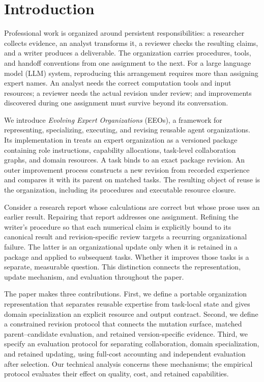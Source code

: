 \section{Introduction}
Professional work is organized around persistent responsibilities: a researcher collects evidence, an analyst transforms it, a reviewer checks the resulting claims, and a writer produces a deliverable. The organization carries procedures, tools, and handoff conventions from one assignment to the next. For a large language model (LLM) system, reproducing this arrangement requires more than assigning expert names. An analyst needs the correct computation tools and input resources; a reviewer needs the actual revision under review; and improvements discovered during one assignment must survive beyond its conversation.

We introduce \emph{Evolving Expert Organizations} (EEOs), a framework for representing, specializing, executing, and revising reusable agent organizations. Its implementation in \oc{} treats an expert organization as a versioned package containing role instructions, capability allocations, task-level collaboration graphs, and domain resources. A task binds to an exact package revision. An outer improvement process constructs a new revision from recorded experience and compares it with its parent on matched tasks. The resulting object of reuse is the organization, including its procedures and executable resource closure.

Consider a research report whose calculations are correct but whose prose uses an earlier result. Repairing that report addresses one assignment. Refining the writer's procedure so that each numerical claim is explicitly bound to its canonical result and revision-specific review targets a recurring organizational failure. The latter is an organizational update only when it is retained in a package and applied to subsequent tasks. Whether it improves those tasks is a separate, measurable question. This distinction connects the representation, update mechanism, and evaluation throughout the paper.

The paper makes three contributions. First, we define a portable organization representation that separates reusable expertise from task-local state and gives domain specialization an explicit resource and output contract. Second, we define a constrained revision protocol that connects the mutation surface, matched parent--candidate evaluation, and retained version-specific evidence. Third, we specify an evaluation protocol for separating collaboration, domain specialization, and retained updating, using full-cost accounting and independent evaluation after selection. Our technical analysis concerns these mechanisms; the empirical protocol evaluates their effect on quality, cost, and retained capabilities.

